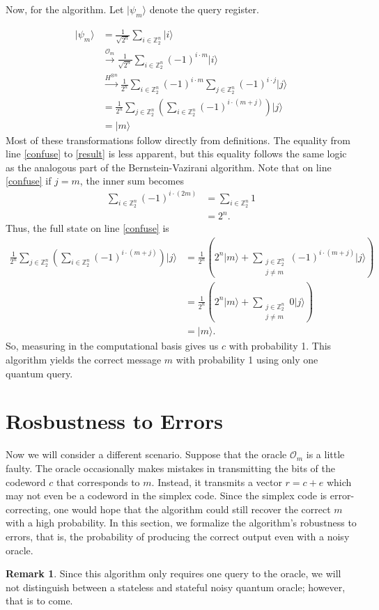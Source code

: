 \documentclass[12pt,twoside]{reedthesis}
\theoremstyle{definition}
\newtheorem{remark}[theorem]{Remark}
\newcommand{\Z}{\mathbb{Z}}
\newcommand{\ket}[1]{\ensuremath{\lvert #1\rangle}\xspace}
\begin{document}
Now, for the algorithm. Let $\ket{\psi_m}$ denote the query register.

\begin{align}
\ket{\psi_m}
& =  \frac{1}{\sqrt{2^n}} \sum_{i \in \Z_2^n} \ket{i} \\
& \xrightarrow{\mathcal{O}_m} \frac{1}{\sqrt{2^n}} \sum_{i \in \Z_2^n} (-1)^{i \cdot m} \ket{i} \\
& \xrightarrow{H^{\otimes n}} \frac{1}{2^n} \sum_{i \in \Z_2^n} (-1)^{i \cdot m} \sum_{j \in \Z_2^n} (-1)^{i \cdot j} \ket{j} \\
& = \frac{1}{2^n} \sum_{j \in \Z_2^n} \left( \sum_{i \in \Z_2^n} (-1)^{i\cdot (m +j)} \right) \ket{j} \label{confuse}\\
& = \ket{m} \label{result}
\end{align}
Most of these transformations follow directly from definitions. The equality from line \ref{confuse} to \ref{result} is less apparent, but this equality follows the same logic as the analogous part of the Bernstein-Vazirani algorithm. Note that on line \ref{confuse} if $j = m$, the inner sum becomes 
\begin{align*}
\sum_{i \in \Z_2^n} (-1)^{i \cdot (2m)} 
&= \sum_{i \in \Z_2^n} 1 \\
& = {2^n}.
\end{align*}
Thus, the full state on line \ref{confuse} is 
\begin{align*}
\frac{1}{2^n} \sum_{j \in \Z_2^n} \left( \sum_{i \in \Z_2^n} (-1)^{i\cdot (m +j)} \right) \ket{j}
& = \frac{1}{2^n} \left (2^n \ket{m}+  \sum\limits_{\substack{j \in \Z_2^n \\ j \neq m}}
 (-1)^{i\cdot (m +j)}\ket{j} \right) \\
 & = \frac{1}{2^n} \left (2^n \ket{m}+  \sum\limits_{\substack{j \in \Z_2^n \\ j \neq m}}
0\ket{j} \right) \\
& = \ket{m}.
\end{align*}
So, measuring in the computational basis gives us $c$ with probability 1. This algorithm yields the correct message $m$ with probability 1 using only one quantum query.
\section{Rosbustness to Errors}
Now we will consider a different scenario. Suppose that the oracle $\mathcal{O}_m$ is a little faulty. The oracle occasionally makes mistakes in transmitting the bits of the codeword $c$ that corresponds to $m$. Instead, it transmits a vector $r = c+ e$ which may not even be a codeword in the simplex code. Since the simplex code is error-correcting, one would hope that the algorithm could still recover the correct $m$ with a high probability. In this section, we formalize the algorithm's robustness to errors, that is, the probability of producing the correct output even with a noisy oracle. 
\begin{remark}
Since this algorithm only requires one query to the oracle, we will not distinguish between a stateless and stateful noisy quantum oracle; however, that is to come.
\end{remark}
\end{document}
